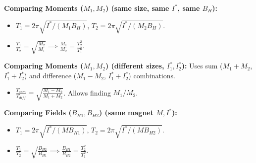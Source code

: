 \begin{frame}[t]
      \item<+-> \textbf{Comparing Moments ($M_1, M_2$) (same size, same $I^*$, same $B_H$):}
        \begin{itemize}
              \item $T_1 = 2\pi \sqrt{I^*/(M_1 B_H)}$, $T_2 = 2\pi \sqrt{I^*/(M_2 B_H)}$.
              \item $\frac{T_1}{T_2} = \sqrt{\frac{M_2}{M_1}} \implies \frac{M_1}{M_2} = \frac{T_2^2}{T_1^2}$.
        \end{itemize}
      \item<+-> \textbf{Comparing Moments ($M_1, M_2$) (different sizes, $I^*_1, I^*_2$):} Uses sum ($M_1+M_2$, $I^*_1+I^*_2$) and difference ($M_1-M_2$, $I^*_1+I^*_2$) combinations.
        \begin{itemize}
             \item $\frac{T_{sum}}{T_{diff}} = \sqrt{\frac{M_1 - M_2}{M_1 + M_2}}$.   Allows finding $M_1/M_2$.
        \end{itemize}
      \item<+-> \textbf{Comparing Fields ($B_{H1}, B_{H2}$) (same magnet $M, I^*$):}
        \begin{itemize}
              \item $T_1 = 2\pi \sqrt{I^*/(M B_{H1})}$, $T_2 = 2\pi \sqrt{I^*/(M B_{H2})}$.
              \item $\frac{T_1}{T_2} = \sqrt{\frac{B_{H2}}{B_{H1}}} \implies \frac{B_{H1}}{B_{H2}} = \frac{T_2^2}{T_1^2}$.
        \end{itemize}
\end{frame}

\transfade[duration=0.5]

